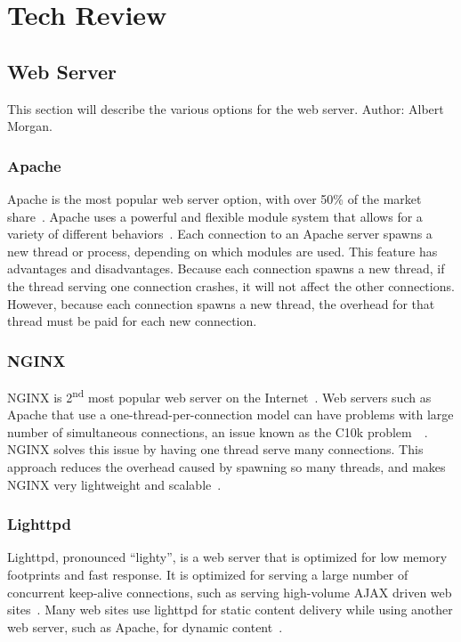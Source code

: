 \documentclass[10pt,draftclsnofoot,onecolumn]{IEEEtran}
\begin{document}
\section{Tech Review}
	\subsection{Web Server}
	This section will describe the various options for the web server. Author: Albert Morgan.

	\subsubsection{Apache}
	Apache is the most popular web server option, with over 50\% of the market share~\cite{apache-usage-statistics}.
	Apache uses a powerful and flexible module system that allows for a variety of different behaviors~\cite{apache-vs-nginx-practical-considerations}.
	Each connection to an Apache server spawns a new thread or process, depending on which modules are used.
	This feature has advantages and disadvantages.
	Because each connection spawns a new thread, if the thread serving one connection crashes, it will not affect the other connections.
	However, because each connection spawns a new thread, the overhead for that thread must be paid for each new connection.

	\subsubsection{NGINX}
	NGINX is 2\textsuperscript{nd} most popular web server on the Internet~\cite{nginx-usage-statistics}.
	Web servers such as Apache that use a one-thread-per-connection model can have problems with large number of simultaneous connections, an issue known as the C10k problem~\cite{apache-vs-nginx-practical-considerations}~\cite{c10k-problem}.
	NGINX solves this issue by having one thread serve many connections.
	This approach reduces the overhead caused by spawning so many threads, and makes NGINX very lightweight and scalable~\cite{nginx-vs-apache-our-view}.
	
	\subsubsection{Lighttpd}
	Lighttpd, pronounced ``lighty'', is a web server that is optimized for low memory footprints and fast response.
	It is optimized for serving a large number of concurrent keep-alive connections, such as serving high-volume AJAX driven web sites~\cite{lighttpd}. Many web sites use lighttpd for static content delivery while using another web server, such as Apache,
	for dynamic content~\cite{powered-by-lighttpd}.
\end{document}
